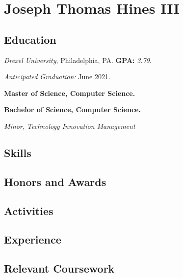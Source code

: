 \documentclass[10pt]{article}
\begin{document}
\section*{Joseph Thomas Hines III}
\label{sec:title}

\begin{multicols}{2}
\subsection*{Education}%
\label{sub:Education}

\emph{Drexel University}, Philadelphia, PA. \textbf{GPA:} \emph{3.79}.

\emph{Anticipated Graduation:} June 2021.

\null

\textbf{Master of Science, Computer Science.}

\textbf{Bachelor of Science, Computer Science.}

\emph{Minor, Technology Innovation Management}

\subsection*{Skills}%
\label{sub:Skills}

\subsection*{Honors and Awards}%
\label{sub:Honors and Awards}

\subsection*{Activities}%
\label{sub:Activities}

\vfill\null
\columnbreak

\subsection*{Experience}%
\label{sub:Experience}

\end{multicols}

\subsection*{Relevant Coursework}%
\label{sub:Relevant Coursework}
\end{document}
